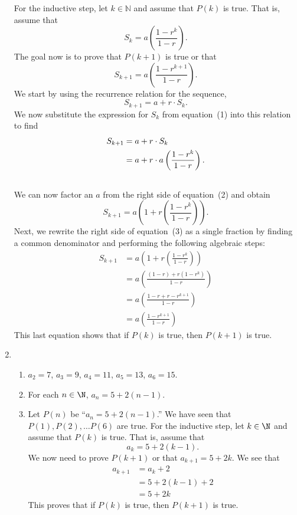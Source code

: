 \begin{enumerate}
\setcounter{equation}{0}
For the inductive step, let  $k \in \mathbb{N}$ and assume that  
$P( k )$ is true.  That is, assume that
%
\begin{equation}
S_k  = a\left( {\frac{{1 - r^k }}{{1 - r}}} \right).
\end{equation}
%
The goal now is to prove that  $P\left( {k + 1} \right)$ is true or that  
\[
S_{k + 1}  = a\left( {\dfrac{{1 - r^{k + 1} }}{{1 - r}}} \right).
\]
We start by using the recurrence relation for the sequence,
\[
S_{k + 1}  = a + r \cdot S_k.
\]
We now substitute the expression for $S_k$ from equation~(1) into this relation to find
%
\begin{align} \notag
  S_{k + 1}  &= a + r \cdot S_k  \\ 
             &= a + r \cdot a\left( {\frac{{1 - r^k }}{{1 - r}}} \right). \\ \notag 
\end{align}
%
We can now factor an  $a$  from the right side of equation~(2) and obtain
%
\begin{equation}
S_{k + 1}  = a\left( {1 + r\left( {\frac{{1 - r^k }}{{1 - r}}} \right)} \right).
\end{equation}
%
Next, we rewrite the right side of equation~(3) as a single fraction by finding a common denominator and performing the following algebraic steps:
%
\begin{align*}
  S_{k + 1}  &= a\left( {1 + r\left( {\frac{{1 - r^k }}{{1 - r}}} \right)} \right) \\ 
             &= a\left( {\frac{{\left( {1 - r} \right) + r\left( {1 - r^k } \right)}}
{{1 - r}}} \right) \\ 
             &= a\left( {\frac{{1 - r + r - r^{k + 1} }}{{1 - r}}} \right) \\ 
             &= a\left( {\frac{{1 - r^{k + 1} }}{{1 - r}}} \right)
\end{align*}
%
This last equation shows that  if $P(k)$ is true, then $P( {k + 1} )$  is true.


\item \begin{enumerate}
\item $a_2 = 7$, $a_3 = 9$, $a_4 = 11$, $a_5 = 13$, $a_6 = 15$.

\item For each $n \in \N$, $a_n = 5 + 2(n - 1)$.

\item Let $P(n)$ be ``$a_n = 5 + 2(n - 1)$.''  We have seen that $P(1), P(2), \ldots P(6)$ are true.  For the inductive step, let $k \in \N$ and assume that $P(k)$ is true.  That is, assume that
\[
a_k = 5 + 2(k - 1).
\]
We now need to prove $P(k+1)$ or that $a_{k+1} = 5 + 2k$.  We see that
\begin{align*}
a_{k+1} &= a_k + 2 \\
        &= 5 + 2(k - 1) + 2 \\
        &= 5 + 2k
\end{align*}
This proves that if $P(k)$ is true, then $P(k + 1)$ is true.
\end{enumerate}




\end{enumerate}

